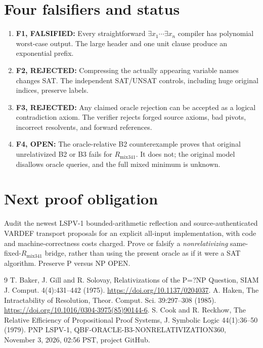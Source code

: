 \documentclass[11pt]{article}
\begin{document}
\section*{Four falsifiers and status}
\begin{enumerate}
\item[] \textbf{F1, FALSIFIED:} Every straightforward $\exists x_1\cdots\exists x_n$ compiler has polynomial worst-case output. The large header and one unit clause produce an exponential prefix.
\item[] \textbf{F2, REJECTED:} Compressing the actually appearing variable names changes SAT. The independent SAT/UNSAT controls, including huge original indices, preserve labels.
\item[] \textbf{F3, REJECTED:} Any claimed oracle rejection can be accepted as a logical contradiction axiom. The verifier rejects forged source axioms, bad pivots, incorrect resolvents, and forward references.
\item[] \textbf{F4, OPEN:} The oracle-relative B2 counterexample proves that original unrelativized B2 or B3 fails for $R_{\mathrm{mix341}}$. It does not; the original model disallows oracle queries, and the full mixed minimum is unknown.
\end{enumerate}

\section*{Next proof obligation}
Audit the newest LSPV-1 bounded-arithmetic reflection and source-authenticated VARDEF transport proposals for an explicit all-input implementation, with code and machine-correctness costs charged. Prove or falsify a \emph{nonrelativizing} same-fixed-$R_{\mathrm{mix341}}$ bridge, rather than using the present oracle as if it were a SAT algorithm. Preserve P versus NP OPEN.

\begin{thebibliography}{9}
 T. Baker, J. Gill and R. Solovay, Relativizations of the P=?NP Question, SIAM J. Comput. 4(4):431--442 (1975). \url{https://doi.org/10.1137/0204037}.
 A. Haken, The Intractability of Resolution, Theor. Comput. Sci. 39:297--308 (1985). \url{https://doi.org/10.1016/0304-3975(85)90144-6}.
 S. Cook and R. Reckhow, The Relative Efficiency of Propositional Proof Systems, J. Symbolic Logic 44(1):36--50 (1979).
 PNP LSPV-1, QBF-ORACLE-B3-NONRELATIVIZATION360, November 3, 2026, 02:56 PST, project GitHub.
\end{thebibliography}
\end{document}
